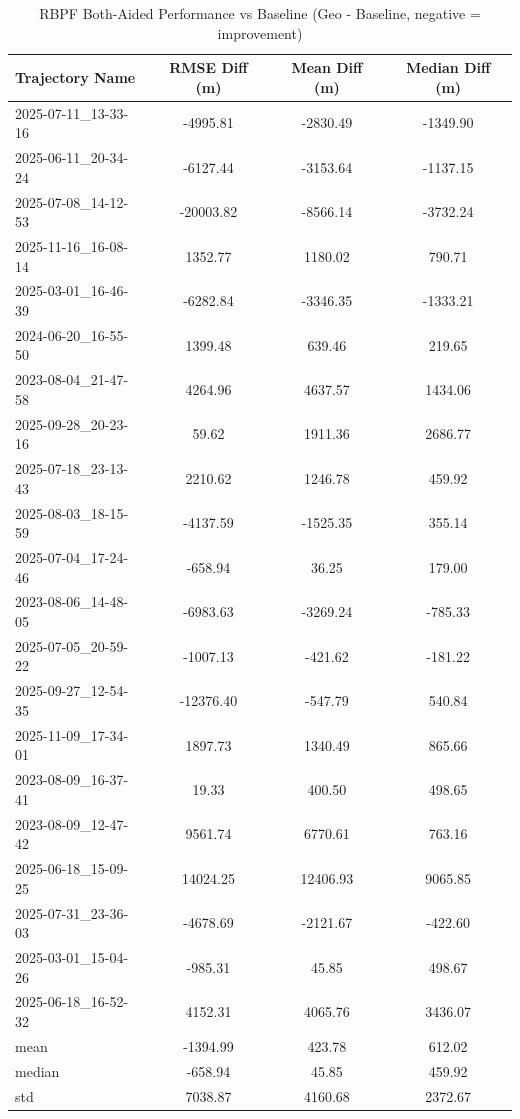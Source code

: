 \begin{table}[h]
    \centering
    \caption{RBPF Both-Aided Performance vs Baseline (Geo - Baseline, negative = improvement)}
    \begin{tabular}{ || l || c c c || }
    \toprule
    Trajectory Name & RMSE Diff (m) & Mean Diff (m) & Median Diff (m) \\
    \midrule
    2025-07-11\_13-33-16 & -4995.81 & -2830.49 & -1349.90 \\
    2025-06-11\_20-34-24 & -6127.44 & -3153.64 & -1137.15 \\
    2025-07-08\_14-12-53 & -20003.82 & -8566.14 & -3732.24 \\
    2025-11-16\_16-08-14 & 1352.77 & 1180.02 & 790.71 \\
    2025-03-01\_16-46-39 & -6282.84 & -3346.35 & -1333.21 \\
    2024-06-20\_16-55-50 & 1399.48 & 639.46 & 219.65 \\
    2023-08-04\_21-47-58 & 4264.96 & 4637.57 & 1434.06 \\
    2025-09-28\_20-23-16 & 59.62 & 1911.36 & 2686.77 \\
    2025-07-18\_23-13-43 & 2210.62 & 1246.78 & 459.92 \\
    2025-08-03\_18-15-59 & -4137.59 & -1525.35 & 355.14 \\
    2025-07-04\_17-24-46 & -658.94 & 36.25 & 179.00 \\
    2023-08-06\_14-48-05 & -6983.63 & -3269.24 & -785.33 \\
    2025-07-05\_20-59-22 & -1007.13 & -421.62 & -181.22 \\
    2025-09-27\_12-54-35 & -12376.40 & -547.79 & 540.84 \\
    2025-11-09\_17-34-01 & 1897.73 & 1340.49 & 865.66 \\
    2023-08-09\_16-37-41 & 19.33 & 400.50 & 498.65 \\
    2023-08-09\_12-47-42 & 9561.74 & 6770.61 & 763.16 \\
    2025-06-18\_15-09-25 & 14024.25 & 12406.93 & 9065.85 \\
    2025-07-31\_23-36-03 & -4678.69 & -2121.67 & -422.60 \\
    2025-03-01\_15-04-26 & -985.31 & 45.85 & 498.67 \\
    2025-06-18\_16-52-32 & 4152.31 & 4065.76 & 3436.07 \\
    \midrule
    mean & -1394.99 & 423.78 & 612.02 \\
    median & -658.94 & 45.85 & 459.92 \\
    std & 7038.87 & 4160.68 & 2372.67 \\
    \bottomrule
    \end{tabular}
    \label{tab:rbpf_both_results}
\end{table}